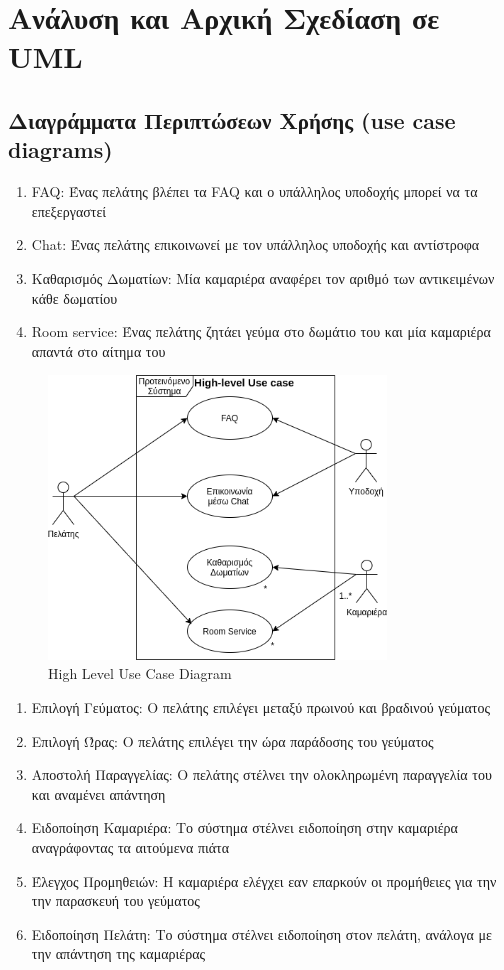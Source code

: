 \chapter{Ανάλυση και Αρχική Σχεδίαση σε UML}
	
\section{Διαγράμματα Περιπτώσεων Χρήσης (use case diagrams)}

\begin{enumerate}
	\item FAQ: Ένας πελάτης βλέπει τα FAQ και ο υπάλληλος υποδοχής μπορεί να τα επεξεργαστεί  
	\item Chat:  Ένας πελάτης επικοινωνεί με τον υπάλληλος υποδοχής και αντίστροφα
	\item Καθαρισμός Δωματίων: Μία καμαριέρα αναφέρει τον αριθμό των αντικειμένων κάθε δωματίου
	\item Room service:  Ένας πελάτης ζητάει γεύμα στο δωμάτιο του και μία καμαριέρα απαντά στο αίτημα του
\end{enumerate}

\begin{figure}[H]
	\centering
	\includegraphics[width=0.8\textwidth]{Images/High_level_use_case}
	\caption{High Level Use Case Diagram}
	\label{high_level_use_case}
\end{figure}
\clearpage

\begin{enumerate}
	\item Επιλογή Γεύματος: Ο πελάτης επιλέγει μεταξύ πρωινού και βραδινού γεύματος
	\item Επιλογή Ώρας: Ο πελάτης επιλέγει την ώρα παράδοσης του γεύματος
	\item Αποστολή Παραγγελίας:  Ο πελάτης στέλνει την ολοκληρωμένη παραγγελία του και αναμένει απάντηση
	\item Ειδοποίηση Καμαριέρα: Το σύστημα στέλνει ειδοποίηση στην καμαριέρα αναγράφοντας τα αιτούμενα πιάτα
	\item Έλεγχος Προμηθειών: Η καμαριέρα ελέγχει εαν επαρκούν οι προμήθειες για την την παρασκευή του γεύματος
	\item Ειδοποίηση Πελάτη: Το σύστημα στέλνει ειδοποίηση στον πελάτη, ανάλογα με την απάντηση της καμαριέρας
\end{enumerate}

